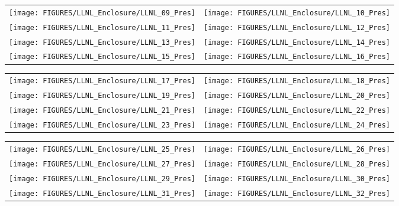 \begin{figure}[p]
\begin{tabular*}{\textwidth}{l@{\extracolsep{\fill}}r}
\texttt{[image: FIGURES/LLNL\_Enclosure/LLNL\_09\_Pres]} &
\texttt{[image: FIGURES/LLNL\_Enclosure/LLNL\_10\_Pres]} \\
\texttt{[image: FIGURES/LLNL\_Enclosure/LLNL\_11\_Pres]} &
\texttt{[image: FIGURES/LLNL\_Enclosure/LLNL\_12\_Pres]} \\
\texttt{[image: FIGURES/LLNL\_Enclosure/LLNL\_13\_Pres]} &
\texttt{[image: FIGURES/LLNL\_Enclosure/LLNL\_14\_Pres]} \\
\texttt{[image: FIGURES/LLNL\_Enclosure/LLNL\_15\_Pres]} &
\texttt{[image: FIGURES/LLNL\_Enclosure/LLNL\_16\_Pres]}
\end{tabular*}
\label{LLNL_Enclosure_Pres_2}
\end{figure}

\begin{figure}[p]
\begin{tabular*}{\textwidth}{l@{\extracolsep{\fill}}r}
\texttt{[image: FIGURES/LLNL\_Enclosure/LLNL\_17\_Pres]} &
\texttt{[image: FIGURES/LLNL\_Enclosure/LLNL\_18\_Pres]} \\
\texttt{[image: FIGURES/LLNL\_Enclosure/LLNL\_19\_Pres]} &
\texttt{[image: FIGURES/LLNL\_Enclosure/LLNL\_20\_Pres]} \\
\texttt{[image: FIGURES/LLNL\_Enclosure/LLNL\_21\_Pres]} &
\texttt{[image: FIGURES/LLNL\_Enclosure/LLNL\_22\_Pres]} \\
\texttt{[image: FIGURES/LLNL\_Enclosure/LLNL\_23\_Pres]} &
\texttt{[image: FIGURES/LLNL\_Enclosure/LLNL\_24\_Pres]}
\end{tabular*}
\label{LLNL_Enclosure_Pres_3}
\end{figure}

\begin{figure}[p]
\begin{tabular*}{\textwidth}{l@{\extracolsep{\fill}}r}
\texttt{[image: FIGURES/LLNL\_Enclosure/LLNL\_25\_Pres]} &
\texttt{[image: FIGURES/LLNL\_Enclosure/LLNL\_26\_Pres]} \\
\texttt{[image: FIGURES/LLNL\_Enclosure/LLNL\_27\_Pres]} &
\texttt{[image: FIGURES/LLNL\_Enclosure/LLNL\_28\_Pres]} \\
\texttt{[image: FIGURES/LLNL\_Enclosure/LLNL\_29\_Pres]} &
\texttt{[image: FIGURES/LLNL\_Enclosure/LLNL\_30\_Pres]} \\
\texttt{[image: FIGURES/LLNL\_Enclosure/LLNL\_31\_Pres]} &
\texttt{[image: FIGURES/LLNL\_Enclosure/LLNL\_32\_Pres]}
\end{tabular*}
\label{LLNL_Enclosure_Pres_4}
\end{figure}

